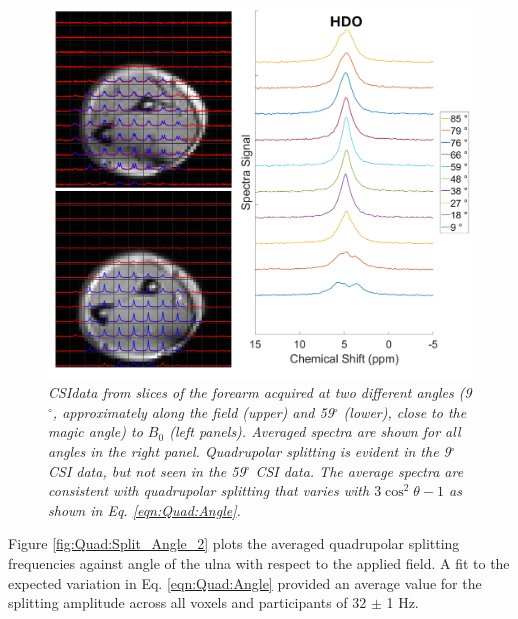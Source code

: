 \begin{figure}
    \centering
    \includegraphics[width=1\textwidth]{Figures/Quad/Arm_CSI_Angle.png}
    \caption{\textit{\ac{CSI}data from slices of the forearm acquired at two different angles (9$^\circ$, approximately along the field (upper) and 59$^\circ$ (lower), close to the magic angle) to $B_0$ (left panels). Averaged spectra are shown for all angles in the right panel. Quadrupolar splitting is evident in the 9$^\circ$ \ac{CSI} data, but not seen in the 59$^\circ$ \ac{CSI} data. The average spectra are consistent with quadrupolar splitting that varies with $3\cos^2\theta - 1$ as shown in Eq. \ref{eqn:Quad:Angle}.}}
    \label{fig:Quad:Arm_CSI}
\end{figure}

 Figure \ref{fig:Quad:Split_Angle_2} plots the averaged quadrupolar splitting frequencies against angle of the ulna with respect to the applied field. A fit to the expected variation in Eq. \ref{eqn:Quad:Angle} provided an average value for the splitting amplitude across all voxels and participants of 32 $\pm$ 1 Hz. 

